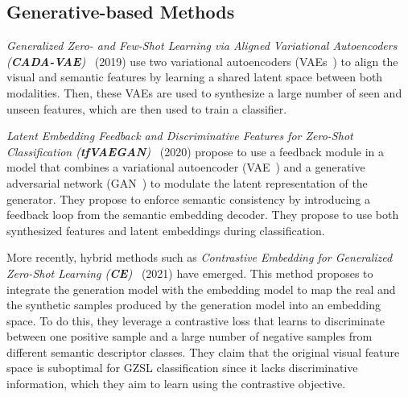 \subsection{Generative-based Methods}


\textit{Generalized Zero- and Few-Shot Learning via Aligned Variational Autoencoders (\textbf{CADA-VAE})}~\cite{CADA_VAE} (2019) use two variational autoencoders (VAEs~\cite{VAEs}) to align the visual and semantic features by learning a shared latent space between both modalities. Then, these VAEs are used to synthesize a large number of seen and unseen features, which are then used to train a classifier.

\textit{Latent Embedding Feedback and Discriminative
Features for Zero-Shot Classification (\textbf{tfVAEGAN})}~\cite{tfvaegan} (2020) propose to use a feedback module in a model that combines a variational autoencoder (VAE~\cite{VAEs}) and a generative adversarial network (GAN~\cite{GANs}) to modulate the latent representation of the generator. They propose to enforce semantic consistency by introducing a feedback loop from the semantic embedding decoder. They propose to use both synthesized features and latent embeddings during classification.



More recently, hybrid methods such as \textit{Contrastive Embedding for Generalized Zero-Shot Learning (\textbf{CE})}~\cite{CE} (2021) have emerged. This method proposes to integrate the generation model with the embedding model to map 
the real and the synthetic samples produced by the generation model into an embedding space. To do this, they leverage a contrastive loss that learns to discriminate between one
positive sample and a large number of negative samples from different semantic descriptor classes. They claim that the original visual feature space is suboptimal for GZSL classification since it lacks discriminative information, which they aim to learn using the contrastive objective.

